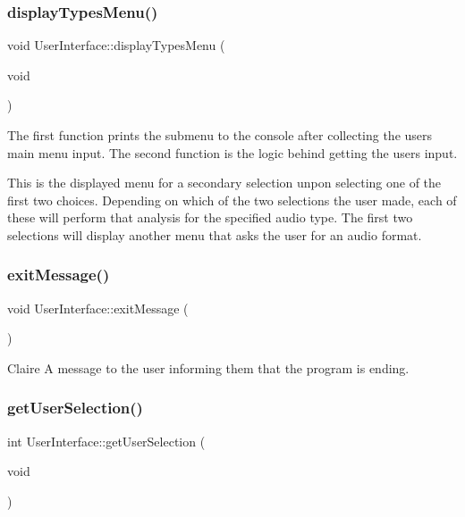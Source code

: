 \subsubsection{\texorpdfstring{display\+Types\+Menu()}{displayTypesMenu()}}
{\footnotesize\ttfamily void User\+Interface\+::display\+Types\+Menu (\begin{DoxyParamCaption}\item[{void}]{ }\end{DoxyParamCaption})}

The first function prints the submenu to the console after collecting the user\textquotesingle{}s main menu input. The second function is the logic behind getting the user\textquotesingle{}s input.

This is the displayed menu for a secondary selection unpon selecting one of the first two choices. Depending on which of the two selections the user made, each of these will perform that analysis for the specified audio type. The first two selections will display another menu that asks the user for an audio format. \mbox{\label{classUserInterface_a929a7747d6ea48b93fde9b6cbc4cb584}} 
\subsubsection{\texorpdfstring{exit\+Message()}{exitMessage()}}
{\footnotesize\ttfamily void User\+Interface\+::exit\+Message (\begin{DoxyParamCaption}{ }\end{DoxyParamCaption})}

Claire A message to the user informing them that the program is ending. \mbox{\label{classUserInterface_aaa6d19efa96815f75b6e5a5612c8ac8c}} 
\subsubsection{\texorpdfstring{get\+User\+Selection()}{getUserSelection()}}
{\footnotesize\ttfamily int User\+Interface\+::get\+User\+Selection (\begin{DoxyParamCaption}\item[{void}]{ }\end{DoxyParamCaption})}

